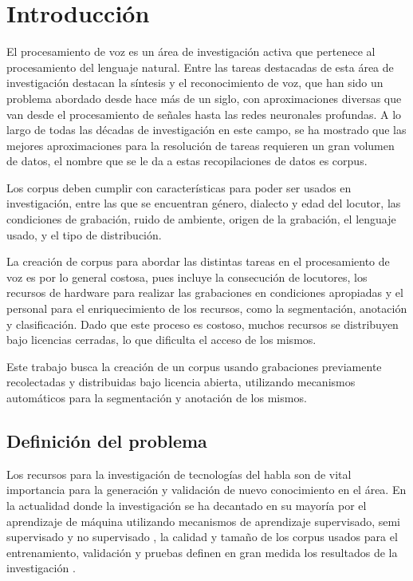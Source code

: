 \chapter{Introducción}

El procesamiento de voz es un área de investigación activa que pertenece al procesamiento del lenguaje natural. Entre las tareas destacadas de esta área de investigación destacan la síntesis y el reconocimiento de voz, que han sido un problema abordado desde hace más de un siglo, con aproximaciones diversas que van desde el procesamiento de señales hasta las redes neuronales profundas. A lo largo de todas las décadas de investigación en este campo, se ha mostrado que las mejores aproximaciones para la resolución de tareas requieren un gran volumen de datos, el nombre que se le da a estas recopilaciones de datos es corpus. 

Los corpus deben cumplir con características para poder ser usados en investigación, entre las que se encuentran género, dialecto y edad del locutor, las condiciones de grabación, ruido de ambiente, origen de la grabación, el lenguaje usado, y el tipo de distribución.

La creación de corpus para abordar las distintas tareas en el procesamiento de voz es por lo general costosa, pues incluye la consecución de locutores, los recursos de hardware para realizar las grabaciones en condiciones apropiadas y el personal para el enriquecimiento de los recursos, como la segmentación, anotación y clasificación. Dado que este proceso es costoso, muchos recursos se distribuyen bajo licencias cerradas, lo que dificulta el acceso de los mismos.

Este trabajo busca la creación de un corpus usando grabaciones previamente recolectadas y distribuidas bajo licencia abierta, utilizando mecanismos automáticos para la segmentación y anotación de los mismos.

\section{Definición del problema}

Los recursos para la investigación de tecnologías del habla son de vital importancia para la generación y validación de nuevo conocimiento en el área. En la actualidad donde la investigación se ha decantado en su mayoría por el aprendizaje de máquina utilizando mecanismos de aprendizaje supervisado, semi supervisado y no supervisado \cite{Chiu2018} \cite{AmazonSemiSupervised}  \cite{ZeroResources}, la calidad y tamaño de los corpus usados para el entrenamiento, validación y pruebas definen en gran medida los resultados de la investigación \cite{Hernandez-Mena2017AutomaticResources}.


